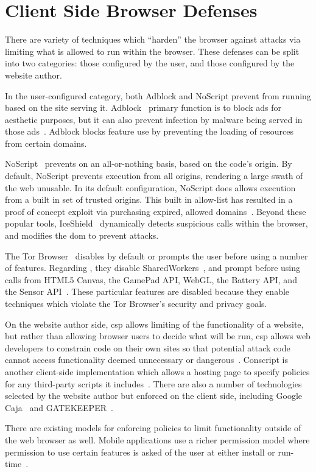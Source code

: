 \section{Client Side Browser Defenses}
\label{background:related-browser-defs}

There are variety of techniques which ``harden'' the browser against attacks
via limiting what \JS is allowed to run within the browser. These defenses can
be split into two categories: those configured by the user, and those
configured by the website author.

In the user-configured category, both Adblock and NoScript prevent \JS from
running based on the site serving it.  Adblock~\cite{adblockplus} primary
function is to block ads for aesthetic purposes, but it can also prevent
infection by malware being served in those
ads~\cite{forbes-malware,engadget-malware}.  Adblock blocks feature use by
preventing the loading of resources from certain domains.

NoScript~\cite{noscriptwebsite} prevents \JS on an
all-or-nothing basis, based on the code's origin.  By default, NoScript prevents
\JS execution from all origins, rendering a large swath of the web unusable.  
In its default configuration, NoScript does allows \JS execution from a built
in set of trusted origins.  This built in allow-list has resulted in a proof of
concept exploit via purchasing expired, allowed domains~\cite{noscript_whitelist}.
Beyond these popular tools, IceShield~\cite{heiderich2011iceshield}
dynamically detects suspicious \JS calls within the browser, and modifies the
\gls{dom} to prevent attacks.

The Tor Browser~\cite{dingledine2004tor} disables by default or prompts the
user before using a number of features.  Regarding \JS, they disable
SharedWorkers~\cite{webworkersw3c}, and prompt before using calls from HTML5
Canvas, the GamePad API, WebGL, the Battery API, and the Sensor
API~\cite{tor-features}.  These particular features are disabled because they
enable techniques which violate the Tor Browser's security and privacy goals.

On the website author side, \gls{csp} allows limiting of the
functionality of a website, but rather than allowing browser users to decide
what will be run, \gls{csp} allows web developers to constrain code on their own
sites so that potential attack code cannot access functionality deemed
unnecessary or dangerous~\cite{stamm2010reining}.  Conscript is another
client-side implementation which allows a hosting page to specify policies for
any third-party scripts it includes~\cite{meyerovich2010conscript}.  There are
also a number of technologies selected by the website author but enforced on
the client side,  including Google Caja~\cite{google13caja} and
GATEKEEPER~\cite{guarnieri09gatekeeper}.

There are existing models for enforcing policies to limit functionality outside
of the web browser as well.  Mobile applications use a richer permission model
where permission to use certain features is asked of the user at either install
or run-time~\cite{android-permissions,au2011short}.
